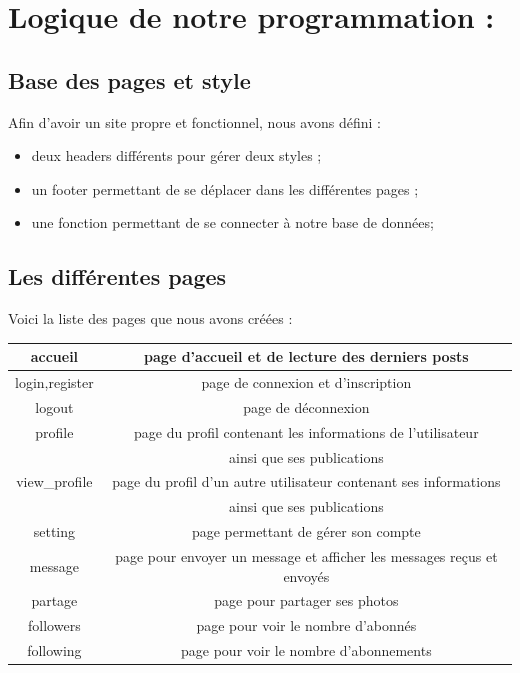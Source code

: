 \documentclass[12pt,a4paper]{article}
\begin{document}
\newpage

\section{Logique de notre programmation :}
\subsection{Base des pages et style}
  Afin d'avoir un site propre et fonctionnel, nous avons défini :
  \begin{itemize}
  \item deux headers différents pour gérer deux styles ;
  \item un footer permettant de se déplacer dans les différentes pages ;
  \item une fonction permettant de se connecter à notre base de données;
  \end{itemize}

\subsection{Les différentes pages}
  Voici la liste des pages que nous avons créées :
  \begin{center}
   \begin{tabular}{|c|c|} %
   \hline
   accueil & page d'accueil et de lecture des derniers posts \\
   \hline
   login,register & page de connexion et d'inscription \\
   \hline
   logout & page de déconnexion \\
   \hline
   profile & page du profil contenant les informations de l'utilisateur \\ & ainsi que ses publications \\
   \hline
   view\_profile & page du profil d'un autre utilisateur contenant ses informations \\ & ainsi que ses publications \\
   \hline
   setting & page permettant de gérer son compte \\
   \hline
   message & page pour envoyer un message et afficher les messages reçus et envoyés \\
   \hline
   partage & page pour partager ses photos \\
   \hline
   followers & page pour voir le nombre d'abonnés  \\
   \hline
   following & page pour voir le nombre d'abonnements \\
   \hline
   \end{tabular}
  \end{center}
  
\end{document}
